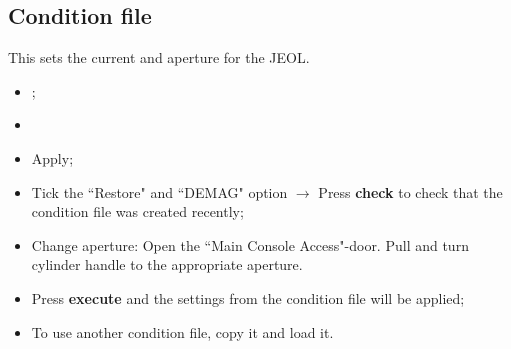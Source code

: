 
\subsection{Condition file}
\begin{framed}\noindent
  This sets the current and aperture for the JEOL.
\end{framed}
\begin{itemize}
\item  {};
\item {}
\item Apply; %
\item Tick the ``Restore" and ``DEMAG" option $\rightarrow$ Press \textbf{check}
  to check that the condition file was created recently;
\item  Change aperture:  Open the  ``Main Console  Access"-door.  Pull  and turn
  cylinder handle  to the appropriate  aperture.  
\item Press  \textbf{execute} and the settings  from the condition file  will be
  applied;
  \item To use another condition file, copy it and load it.
\end{itemize}

